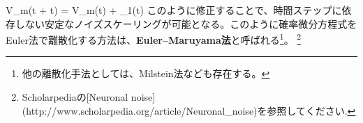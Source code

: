 V_m(t + \Delta t) = V_m(t) +  \xi_1(t)
このように修正することで、時間ステップに依存しない安定なノイズスケーリングが可能となる。このように確率微分方程式をEuler法で離散化する方法は、\textbf{Euler–Maruyama法}と呼ばれる\footnote{他の離散化手法としては、Milstein法なども存在する。}。
\footnote{Scholarpediaの[Neuronal noise](http://www.scholarpedia.org/article/Neuronal_noise)を参照してください. }
